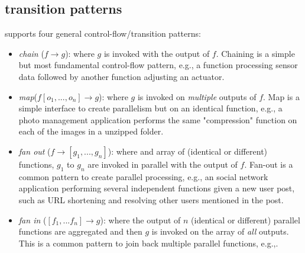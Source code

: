 \subsection{ transition patterns}
\label{sec:transition-patterns}

%
%

\name{} supports four general  control-flow/transition patterns: 
\begin{itemize}
	\item \textit{chain} ($f\rightarrow g$): where $g$ is invoked with the output of $f$. Chaining is a simple but most fundamental control-flow pattern, e.g.,  a function processing sensor data followed by another function adjusting an
	actuator. 
	\item \textit{map}($f[o_1, ..., o_n]\rightarrow g$): where $g$ is invoked on  \textit{multiple} outputs of $f$. Map is a simple interface to create parallelism but on an identical function, e.g.,  a photo management application performs the same "compression" function on
	each of the images in a unzipped folder. 
	\item \textit{fan out} ($f\rightarrow [g_1, ..., g_n]$): where and array of (identical or different) functions, $g_1$ to $g_n$ are invoked in parallel with the output of $f$. Fan-out is a common pattern to create parallel processing,  e.g.,  an social network application performing
	several independent functions given a new user post, such as URL shortening
	and resolving other users mentioned in the post. 
	\item \textit{fan in} ($[f_1, ...f_n] \rightarrow g$): where the output of $n$ (identical or different) parallel functions are aggregated and then $g$ is invoked on the array of \textit{all} outputs. This is a common pattern to join back multiple parallel functions, e.g.,. 
\end{itemize}

